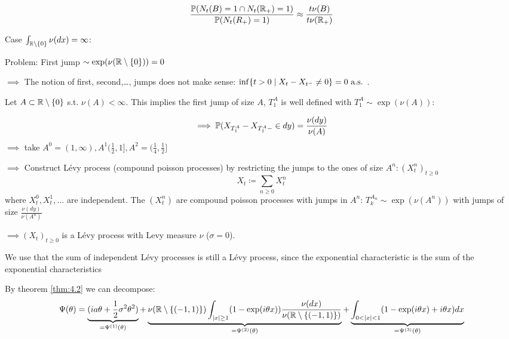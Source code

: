 \begin{align*}
    \frac{\mathbb{P}(N_t(B)=1\cap N_t(\mathbb{R}_+)=1)}{\mathbb{P}(N_t(R_+)=1)}\approx\frac{t\nu(B)}{t\nu(\mathbb{R}_+)}
\end{align*}

Case $\int_{\mathbb{R}\setminus \{0\}}\nu(dx)=\infty$:

Problem: First jump $\sim\exp(\nu(\mathbb{R}\setminus\{0\}))=0$

$\implies$ The notion of first, second,\dots, jumps does not make sense: $\inf\{t>0\mid X_t-X_{t^-}\neq 0\}=0\text{ a.s. }$.

Let $A\subset\mathbb{R}\setminus\{0\}$ s.t. $\nu(A)<\infty$. This implies the first jump of size $A$, $T_1^A$ is well defined with 
$T_1^A \sim\exp(\nu(A))$:

\[\implies \mathbb{P}(X_{T_1^A}-X_{T_1^A-}\in dy)=\frac{\nu(dy)}{\nu(A)}\]
$\implies$ take $A^0=(1,\infty),A^1(\frac{1}{2},1], A^2=(\frac{1}{4},\frac{1}{2}]$

$\implies$ Construct Lévy process (compound poisson processes) by restricting the jumps to the ones of size $A^n:(X_t^n)_{t\geq 0}$
\[X_t\coloneqq \sum_{n\geq 0} X_t^n\]
where $X_t^0,X_t^1,\dots$ are independent. The $(X_t^n)$ are compound poisson processes with jumps in $A^n$: $T_k^{A_n}\sim\exp(\nu(A^n))$ with jumps of size $\frac{\nu(dy)}{\nu(A^n)}$

$\implies (X_t)_{t\geq 0}$ is a Lévy process with Levy measure $\nu$ ($\sigma=0$).

\begin{aremark}
    We use that the sum of independent Lévy processes is still a Lévy process, since the exponential characteristic is the sum of the exponential characteristics
\end{aremark}

By theorem \ref{thm:4.2} we can decompose:
\[\Psi(\theta)=\underbrace{(ia\theta+\frac{1}{2}\sigma^2\theta^2)}_{=\Psi^{(1)}(\theta)}+\underbrace{\nu(\R\setminus\{(-1,1)\})\int_{|x|\geq 1}(1-\exp(i\theta x))\frac{\nu(dx)}{\nu(\R\setminus\{(-1,1)\})}}_{=\Psi^{(2)}(\theta)}+\underbrace{\int_{0<|x|<1} (1-\exp(i\theta x)+i\theta x)dx}_{=\Psi^{(3)}(\theta)}\]

